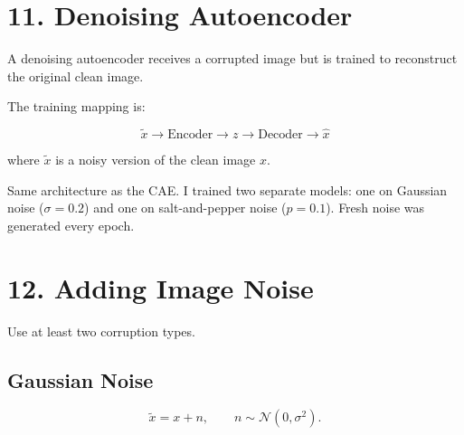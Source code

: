 \documentclass[10pt]{article}
\begin{document}
\section*{11. Denoising Autoencoder}

A denoising autoencoder receives a corrupted image but is trained to
reconstruct the original clean image.

The training mapping is:

\[
\boxed{\tilde{x}\rightarrow\text{Encoder}\rightarrow z
\rightarrow\text{Decoder}\rightarrow\hat{x}}
\]

where $\tilde{x}$ is a noisy version of the clean image $x$.

\begin{center}
\end{center}

Same architecture as the CAE. I trained two separate models: one on Gaussian noise ($\sigma=0.2$) and one on salt-and-pepper noise ($p=0.1$). Fresh noise was generated every epoch.

\section*{12. Adding Image Noise}

Use at least two corruption types.

\subsection*{Gaussian Noise}

\[
\tilde{x}=x+n,
\qquad
n\sim\mathcal{N}(0,\sigma^2).
\]
\end{document}
